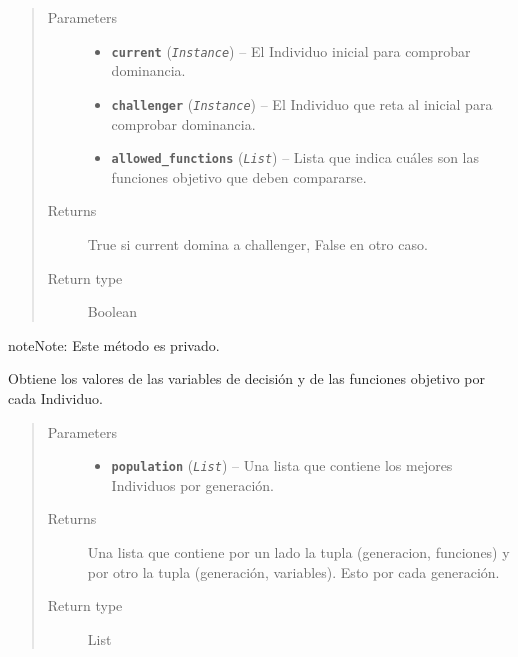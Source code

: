 \documentclass[class=report, crop=false]{standalone}
\begin{document}
\begin{fulllineitems}
\begin{fulllineitems}
\begin{quote}\begin{description}
\item[{Parameters}] \leavevmode\begin{itemize}
\item \textbf{\texttt{current}} (\emph{\texttt{Instance}}) -- El Individuo inicial para comprobar dominancia.
\item \textbf{\texttt{challenger}} (\emph{\texttt{Instance}}) -- El Individuo que reta al inicial para comprobar dominancia.
\item \textbf{\texttt{allowed\_functions}} (\emph{\texttt{List}}) -- Lista que indica cuáles son las funciones objetivo que deben 
compararse.
\end{itemize}

\item[{Returns}] \leavevmode
True si current domina a challenger, False en otro caso.
\item[{Return type}] \leavevmode
Boolean
\end{description}\end{quote}

\end{fulllineitems}

\begin{fulllineitems}


\begin{notice}{note}{Note:}
Este método es privado.
\end{notice}

Obtiene los valores de las variables de decisión y de las 
funciones objetivo por cada Individuo.

\begin{quote}\begin{description}
\item[{Parameters}] \leavevmode\begin{itemize}
\item \textbf{\texttt{population}} (\emph{\texttt{List}}) -- Una lista que contiene los mejores Individuos por generación.
\end{itemize}
\item[{Returns}] \leavevmode
Una lista que contiene por un lado la tupla (generacion, funciones)
y por otro la tupla (generación, variables). Esto por cada generación.
\item[{Return type}] \leavevmode
List
\end{description}\end{quote}


\end{fulllineitems}
\end{fulllineitems}
\end{document}
